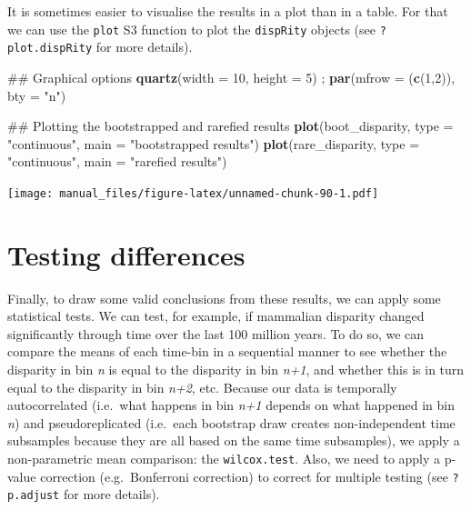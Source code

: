 \documentclass[]{book}
\newenvironment{Shaded}{\begin{snugshade}}{\end{snugshade}}
\newcommand{\KeywordTok}[1]{\textcolor[rgb]{0.13,0.29,0.53}{\textbf{#1}}}
\newcommand{\DataTypeTok}[1]{\textcolor[rgb]{0.13,0.29,0.53}{#1}}
\newcommand{\DecValTok}[1]{\textcolor[rgb]{0.00,0.00,0.81}{#1}}
\newcommand{\StringTok}[1]{\textcolor[rgb]{0.31,0.60,0.02}{#1}}
\newcommand{\NormalTok}[1]{#1}
\theoremstyle{definition}
\theoremstyle{definition}
\theoremstyle{remark}
\begin{document}
It is sometimes easier to visualise the results in a plot than in a
table. For that we can use the \texttt{plot} S3 function to plot the
\texttt{dispRity} objects (see \texttt{?plot.dispRity} for more
details).

\begin{Shaded}
\begin{Highlighting}[]
\NormalTok{## Graphical options}
\KeywordTok{quartz}\NormalTok{(}\DataTypeTok{width =} \DecValTok{10}\NormalTok{, }\DataTypeTok{height =} \DecValTok{5}\NormalTok{) ; }\KeywordTok{par}\NormalTok{(}\DataTypeTok{mfrow =}\NormalTok{ (}\KeywordTok{c}\NormalTok{(}\DecValTok{1}\NormalTok{,}\DecValTok{2}\NormalTok{)), }\DataTypeTok{bty =} \StringTok{"n"}\NormalTok{)}

\NormalTok{## Plotting the bootstrapped and rarefied results}
\KeywordTok{plot}\NormalTok{(boot_disparity, }\DataTypeTok{type =} \StringTok{"continuous"}\NormalTok{, }\DataTypeTok{main =} \StringTok{"bootstrapped results"}\NormalTok{)}
\KeywordTok{plot}\NormalTok{(rare_disparity, }\DataTypeTok{type =} \StringTok{"continuous"}\NormalTok{, }\DataTypeTok{main =} \StringTok{"rarefied results"}\NormalTok{)}
\end{Highlighting}
\end{Shaded}

\texttt{[image: manual\_files/figure-latex/unnamed-chunk-90-1.pdf]}

\section{Testing differences}\label{testing-differences}

Finally, to draw some valid conclusions from these results, we can apply
some statistical tests. We can test, for example, if mammalian disparity
changed significantly through time over the last 100 million years. To
do so, we can compare the means of each time-bin in a sequential manner
to see whether the disparity in bin \emph{n} is equal to the disparity
in bin \emph{n+1}, and whether this is in turn equal to the disparity in
bin \emph{n+2}, etc. Because our data is temporally autocorrelated
(i.e.~what happens in bin \emph{n+1} depends on what happened in bin
\emph{n}) and pseudoreplicated (i.e.~each bootstrap draw creates
non-independent time subsamples because they are all based on the same
time subsamples), we apply a non-parametric mean comparison: the
\texttt{wilcox.test}. Also, we need to apply a p-value correction
(e.g.~Bonferroni correction) to correct for multiple testing (see
\texttt{?p.adjust} for more details).
\end{document}

